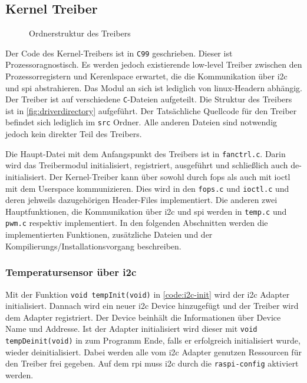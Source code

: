 \subsection{Kernel Treiber}

\begin{wrapfigure}[23]{o}[1cm]{8cm}
\caption{Ordnerstruktur des Treibers}
\label{fig:driverdirectory}
\end{wrapfigure}

Der Code des Kernel-Treibers ist in \texttt{C99} geschrieben.
Dieser ist Prozessoragnostisch.
Es werden jedoch existierende low-level Treiber zwischen den Prozessorregistern und Kerenlspace erwartet, die die Kommunikation über \gls{i2c} und \gls{spi} abstrahieren.
Das Modul an sich ist lediglich von linux-Headern abhängig.
Der Treiber ist auf verschiedene \texttt{C}-Dateien aufgeteilt.
Die Struktur des Treibers ist in \autoref{fig:driverdirectory} aufgeführt.
Der Tatsächliche Quellcode für den Treiber befindet sich lediglich im \texttt{src} Ordner.
Alle anderen Dateien sind notwendig jedoch kein direkter Teil des Treibers.

Die Haupt-Datei mit dem Anfangspunkt des Treibers ist in \texttt{fanctrl.c}.
Darin wird das Treibermodul initialisiert, registriert, ausgeführt und schließlich auch de-initialisiert.
Der Kernel-Treiber kann über sowohl durch \gls{fops} als auch mit \gls{ioctl} mit dem Userspace kommunizieren.
Dies wird in den \texttt{fops.c} und \texttt{ioctl.c} und deren jehweils dazugehörigen Header-Files implementiert.
Die anderen zwei Hauptfunktionen, die Kommunikation über \gls{i2c} und \gls{spi} werden in \texttt{temp.c} und \texttt{pwm.c} respektiv implementiert.
In den folgenden Abschnitten werden die implementierten Funktionen, zusätzliche Dateien und der Kompilierungs/Installationsvorgang beschreiben.

\subsubsection{Temperatursensor über \acrshort{i2c}}

Mit der Funktion \texttt{void tempInit(void)} in \autoref{code:i2c-init} wird der \gls{i2c} Adapter initialisiert.
Dannach wird ein neuer \gls{i2c} Device hinzugefügt und der Treiber wird dem Adapter registriert.
Der Device beinhält die Informationen über Device Name und Addresse.
Ist der Adapter initialisiert wird dieser mit \texttt{void tempDeinit(void)} in \label{code:i2c-deinit} zum Programm Ende, falls er erfolgreich initialisiert wurde, wieder deinitialisiert.
Dabei werden alle vom \gls{i2c} Adapter genutzen Ressourcen für den Treiber frei gegeben.
Auf dem \gls{rpi} muss \gls{i2c} durch die \texttt{raspi-config} aktiviert werden.

